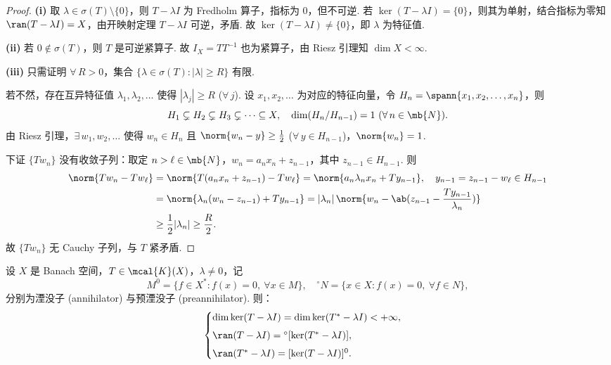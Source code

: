 \begin{proof}
\textbf{(i)} 取 $\lambda \in \sigma(T)\setminus\{0\}$，则 $T-\lambda I$ 为 Fredholm 算子，指标为 $0$，但不可逆. 若 $\ker(T-\lambda I) = \{0\}$，则其为单射，结合指标为零知 $\ran(T-\lambda I) = X$，由开映射定理 $T-\lambda I$ 可逆，矛盾. 故 $\ker(T-\lambda I) \neq \{0\}$，即 $\lambda$ 为特征值.\par
\textbf{(ii)} 若 $0 \notin \sigma(T)$，则 $T$ 是可逆紧算子. 故 $I_X = TT^{-1}$ 也为紧算子，由 Riesz 引理知 $\dim X < \infty$.\par
\textbf{(iii)} 只需证明 $\forall\, R>0$，集合 $\{\lambda \in \sigma(T): |\lambda| \geq R\}$ 有限.\par
若不然，存在互异特征值 $\lambda_1, \lambda_2, \dots$ 使得 $|\lambda_j| \geq R$ ($\forall\, j$). 设 $x_1, x_2, \dots$ 为对应的特征向量，令 $H_n = \spann\{x_1,x_2,\dots,x_n\}$，则
\begin{equation*}
H_1 \subsetneq H_2 \subsetneq H_3 \subsetneq \cdots \subseteq X,\quad \dim(H_n/H_{n-1}) = 1\ (\forall\, n \in \mb{N}).
\end{equation*}
由 Riesz 引理，$\exists\, w_1, w_2, \dots$ 使得 $w_n \in H_n$ 且 $\norm{w_n - y} \geq \frac{1}{2}$ ($\forall\, y \in H_{n-1}$)，$\norm{w_n}=1$.\par
下证 $\{Tw_n\}$ 没有收敛子列：取定 $n > \ell \in \mb{N}$，$w_n = a_n x_n + z_{n-1}$，其中 $z_{n-1} \in H_{n-1}$. 则
\begin{align*}
\norm{Tw_n - Tw_\ell}
&= \norm{T(a_n x_n + z_{n-1}) - Tw_\ell}
= \norm{a_n \lambda_n x_n + Ty_{n-1}},\quad y_{n-1} = z_{n-1} - w_\ell \in H_{n-1}\\
&= \norm{\lambda_n(w_n - z_{n-1}) + Ty_{n-1}}
= |\lambda_n| \,\norm{w_n - \ab(z_{n-1} - \frac{Ty_{n-1}}{\lambda_n})}\\
&\geq \frac{1}{2}|\lambda_n| \geq \frac{R}{2}.
\end{align*}
故 $\{Tw_n\}$ 无 Cauchy 子列，与 $T$ 紧矛盾.
\end{proof}

\begin{theorem}\label{thm:riesz-schauder}
设 $X$ 是 Banach 空间，$T \in \mcal{K}(X)$，$\lambda \neq 0$，记
\begin{equation*}
M^0 = \{f \in X^*: f(x)=0,\ \forall x \in M\},\quad
{}^\circ N = \{x \in X: f(x)=0,\ \forall f \in N\},
\end{equation*}
分别为湮没子 (annihilator) 与预湮没子 (preannihilator). 则：
\begin{equation*}
\begin{cases}
\dim \ker(T-\lambda I) = \dim \ker(T^*-\lambda I) < +\infty,\\[4pt]
\ran(T-\lambda I) = {}^\circ[\ker(T^*-\lambda I)],\\[4pt]
\ran(T^*-\lambda I) = [\ker(T-\lambda I)]^0.
\end{cases}
\end{equation*}
\end{theorem}

